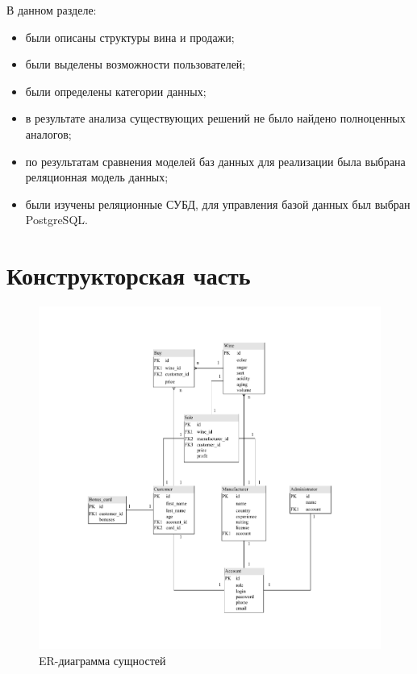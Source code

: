 В данном разделе:
\begin{itemize}
	\item были описаны структуры вина и продажи;
	\item были выделены возможности пользователей;
	\item были определены категории данных; 
	\item в результате анализа существующих решений не было найдено полноценных аналогов;
	\item по результатам сравнения моделей баз данных для реализации была выбрана реляционная модель данных;
	\item были изучены реляционные СУБД, для управления базой данных был выбран PostgreSQL.
\end{itemize}

\chapter{Конструкторская часть}

\begin{figure}[H]
	\begin{center}
		\includegraphics[scale=0.75]{img/ER-diagram.pdf}
	\end{center}
	\captionsetup{justification=centering}
	\caption{ER-диаграмма сущностей}
	\label{img:er}
\end{figure}

